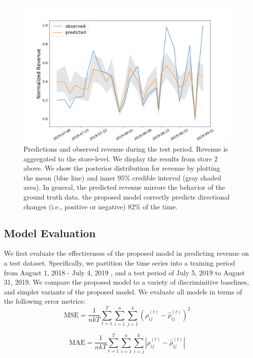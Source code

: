 \begin{figure}
    \centering
    \includegraphics[scale=.3]{figs/total-ppc-hierarchical-store-2-train.png}
    \caption{Predictions and observed revenue during the test period. Revenue is aggregated to the store-level. We display the results from store 2 above. We show the posterior distribution for revenue by plotting the mean (blue line) and inner 95\% credible interval (gray shaded area). In general, the predicted revenue mirrors the behavior of the ground truth data. the proposed model correctly predicts directional changes (i.e., positive or negative) 82\% of the time.}
\label{data-overview}
\end{figure}



\subsection{Model Evaluation}

We first evaluate the effectiveness of the proposed model in predicting revenue on a test dataset. Specifically, we partition the time series into a training period from August 1, 2018 - July 4, 2019 , and a test period of July 5, 2019 to August 31, 2019. We compare the proposed model to a variety of discriminitive baselines, and simpler variants of the proposed model. We evaluate all models in terms of the following error metrics:
\begin{equation}
    \text{MSE} =  \frac{1}{nkT} \sum_{t=1}^T\sum_{i=1}^n \sum_{j=1}^k (\rho^{(t)}_{ij} - \hat{\rho}^{(t)}_{ij})^2
\end{equation}

\begin{equation}
    \text{MAE} =  \frac{1}{nkT} \sum_{t=1}^T\sum_{i=1}^n \sum_{i=j}^k | \rho^{(t)}_{ij} - \hat{\rho}^{(t)}_{ij} |
\end{equation}

